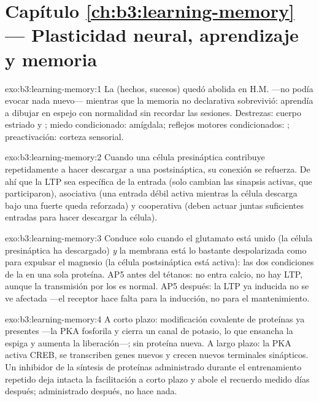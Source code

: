 \section*{Capítulo \ref{ch:b3:learning-memory} --- Plasticidad neural, aprendizaje y memoria}

\begin{solution}{exo:b3:learning-memory:1}
La  (hechos, sucesos) quedó abolida en H.M. ---no
podía evocar nada nuevo--- mientras que la memoria no declarativa
sobrevivió: aprendía a dibujar en espejo con normalidad sin recordar
las sesiones. Destrezas: cuerpo estriado y ; miedo
condicionado: amígdala; reflejos motores condicionados: ;
preactivación: corteza sensorial.
\end{solution}

\begin{solution}{exo:b3:learning-memory:2}
Cuando una célula presináptica contribuye repetidamente a hacer
descargar a una postsináptica, su conexión se refuerza. De ahí que la
LTP sea específica de la entrada (solo cambian las sinapsis activas,
que participaron), asociativa (una entrada débil activa mientras la
célula descarga bajo una fuerte queda reforzada) y cooperativa (deben
actuar juntas suficientes entradas para hacer descargar la célula).
\end{solution}

\begin{solution}{exo:b3:learning-memory:3}
Conduce solo cuando el glutamato está unido (la célula presináptica ha
descargado) \emph{y} la membrana está lo bastante despolarizada como
para expulsar el magnesio (la célula postsináptica está activa): las
dos condiciones de la  en una sola proteína. AP5 antes del
tétanos: no entra calcio, no hay LTP, aunque la transmisión por los
 es normal. AP5 después: la LTP ya inducida no se ve
afectada ---el receptor hace falta para la inducción, no para el
mantenimiento.
\end{solution}

\begin{solution}{exo:b3:learning-memory:4}
A corto plazo: modificación covalente de proteínas ya presentes ---la
PKA fosforila y cierra un canal de potasio, lo que ensancha la espiga y
aumenta la liberación---; sin proteína nueva. A largo plazo: la PKA
activa CREB, se transcriben genes nuevos y crecen nuevos terminales
sinápticos. Un inhibidor de la síntesis de proteínas administrado
durante el entrenamiento repetido deja intacta la facilitación a corto
plazo y abole el recuerdo medido días después; administrado después, no
hace nada.
\end{solution}


